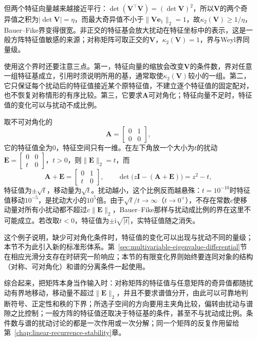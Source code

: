 但两个特征向量越来越接近平行：$\det(\bm V^\top\bm V)=(\det\bm V)^2$，所以$\bm V$的两个奇异值之积为$|\det\bm V|=\eta$，而最大奇异值不小于$\lVert\bm V\bm e_1\rVert_2=1$，故$\kappa_2(\bm V)\geq1/\eta$，Bauer--Fike界变得很宽。非正交的特征基会放大扰动在特征坐标中的表示，这是一般方阵特征值敏感的来源；对称矩阵可取正交的$\bm V$，$\kappa_2(\bm V)=1$，界与Weyl界同量级。

使用这个界时还要注意三点。第一，特征向量的缩放会改变$\bm V$的条件数，界对任意一组特征基成立，引用时须说明所用的基，通常取使$\kappa_2(\bm V)$较小的一组。第二，它只保证每个扰动后的特征值接近某个原特征值，不建立逐个特征值的固定配对，也不恢复对称情形的有序比较。第三，它要求$\bm A$可对角化；特征向量不足时，特征值的变化可以与扰动不成比例。
\begin{example}[特征值的移动远大于扰动]
\label{ex:ls-jordan-eigenvalue-sensitivity}
取不可对角化的
\[
 \bm A=\begin{bmatrix}0&1\\0&0\end{bmatrix},
\]
它的特征值全为$0$，特征空间只有一维。在左下角放一个大小为$t$的扰动$\bm E=\left[\begin{smallmatrix}0&0\\t&0\end{smallmatrix}\right]$，$t>0$，则$\lVert\bm E\rVert_2=t$，而
\[
 \bm A+\bm E=\begin{bmatrix}0&1\\t&0\end{bmatrix},\qquad
 \det\bigl(z\bm I-(\bm A+\bm E)\bigr)=z^2-t ,
\]
特征值为$\pm\sqrt t$，移动量为$\sqrt t$。扰动越小，这个比例反而越悬殊：$t=10^{-10}$时特征值移动$10^{-5}$，是扰动大小的$10^5$倍。由于$\sqrt t/t\to\infty$（$t\to0^+$），不存在常数$c$使移动量对所有小扰动都不超过$c\lVert\bm E\rVert_2$，Bauer--Fike那样与扰动成比例的界在这里不可能成立。若改取$t<0$，特征值为$\pm\mathrm i\sqrt{|t|}$，实特征值随之消失。
\end{example}
这个例子说明，缺少可对角化条件时，特征值的变化可以出现与扰动不同的量级；本节不为此引入新的标准形体系。第~\ref{sec:multivariable-eigenvalue-differential}节在相应光滑分支存在时研究一阶响应；本节的有限变化界则始终要连同对象的结构（对称、可对角化）和谱的分离条件一起使用。

综合起来，把矩阵本身当作输入时：对称矩阵的特征值与任意矩阵的奇异值都随扰动有界地移动，移动量不超过$\lVert\bm E\rVert_2$，并且不要求谱值分开，由此可以可靠地判断符号、正定性和秩的下界；所选子空间的方向要用主夹角比较，偏转由扰动与谱隙之比控制；一般方阵的特征值还取决于特征基的条件，甚至不与扰动成比例。条件数与谱的扰动讨论的都是一次作用或一次分解；同一个矩阵的反复作用留给第~\ref{chap:linear-recurrence-stability}章。
